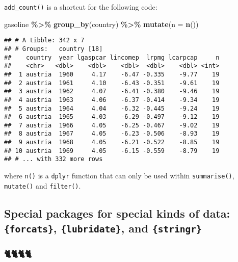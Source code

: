 \documentclass[
]{article}
\newenvironment{Shaded}{\begin{snugshade}}{\end{snugshade}}
\newcommand{\DataTypeTok}[1]{\textcolor[rgb]{0.13,0.29,0.53}{#1}}
\newcommand{\KeywordTok}[1]{\textcolor[rgb]{0.13,0.29,0.53}{\textbf{#1}}}
\newcommand{\NormalTok}[1]{#1}
\newcommand{\OperatorTok}[1]{\textcolor[rgb]{0.81,0.36,0.00}{\textbf{#1}}}
\newcommand{\StringTok}[1]{\textcolor[rgb]{0.31,0.60,0.02}{#1}}
\begin{document}
\texttt{add\_count()} is a shortcut for the following code:

\begin{Shaded}
\begin{Highlighting}[]
\NormalTok{gasoline }\OperatorTok{\%\textgreater{}\%}
\StringTok{  }\KeywordTok{group\_by}\NormalTok{(country) }\OperatorTok{\%\textgreater{}\%}
\StringTok{  }\KeywordTok{mutate}\NormalTok{(}\DataTypeTok{n =} \KeywordTok{n}\NormalTok{())}
\end{Highlighting}
\end{Shaded}

\begin{verbatim}
## # A tibble: 342 x 7
## # Groups:   country [18]
##    country  year lgaspcar lincomep  lrpmg lcarpcap     n
##    <chr>   <dbl>    <dbl>    <dbl>  <dbl>    <dbl> <int>
##  1 austria  1960     4.17    -6.47 -0.335    -9.77    19
##  2 austria  1961     4.10    -6.43 -0.351    -9.61    19
##  3 austria  1962     4.07    -6.41 -0.380    -9.46    19
##  4 austria  1963     4.06    -6.37 -0.414    -9.34    19
##  5 austria  1964     4.04    -6.32 -0.445    -9.24    19
##  6 austria  1965     4.03    -6.29 -0.497    -9.12    19
##  7 austria  1966     4.05    -6.25 -0.467    -9.02    19
##  8 austria  1967     4.05    -6.23 -0.506    -8.93    19
##  9 austria  1968     4.05    -6.21 -0.522    -8.85    19
## 10 austria  1969     4.05    -6.15 -0.559    -8.79    19
## # ... with 332 more rows
\end{verbatim}

where \texttt{n()} is a \texttt{dplyr} function that can only be used within \texttt{summarise()}, \texttt{mutate()} and
\texttt{filter()}.

\hypertarget{special-packages-for-special-kinds-of-data-forcats-lubridate-and-stringr}{%
\subsection{\texorpdfstring{Special packages for special kinds of data: \texttt{\{forcats\}}, \texttt{\{lubridate\}}, and \texttt{\{stringr\}}}{Special packages for special kinds of data: \{forcats\}, \{lubridate\}, and \{stringr\}}}\label{special-packages-for-special-kinds-of-data-forcats-lubridate-and-stringr}}

\hypertarget{section}{%
\subsubsection{🐈🐈🐈🐈}\label{section}}
\end{document}
